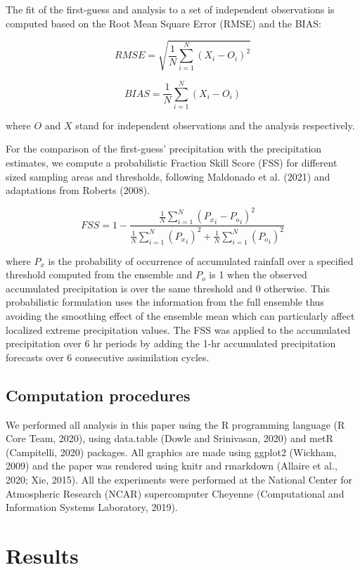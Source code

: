 \documentclass[final,5p,times,twocolumn,authoryear]{elsarticle} %
\begin{document}
The fit of the first-guess and analysis to a set of independent observations is computed based on the Root Mean Square Error (RMSE) and the BIAS:

\[\mathit{RMSE} = \sqrt{\frac{1}{N}\sum_{i = 1}^{N} (X_i - O_i)^{2}}\]

\[\mathit{BIAS} = \frac{1}{N}\sum_{i = 1}^{N} (X_i - O_i)\]

where \(O\) and \(X\) stand for independent observations and the analysis respectively.

For the comparison of the first-guess' precipitation with the precipitation estimates, we compute a probabilistic Fraction Skill Score (FSS) for different sized sampling areas and thresholds, following Maldonado et al. (2021) and adaptations from Roberts (2008).

\[\mathit{FSS} = 1-\frac{\frac{1}{N}\sum_{i=1}^{N} ({P_x}_i-{P_o}_i)^{2}}{\frac{1}{N}\sum_{i=1}^{N} ({P_x}_i)^{2}+\frac{1}{N}\sum_{i=1}^{N} ({P_o}_i)^{2}} \]

where \({P_x}\) is the probability of occurrence of accumulated rainfall over a specified threshold computed from the ensemble and \({P_o}\) is 1 when the observed accumulated precipitation is over the same threshold and 0 otherwise. This probabilistic formulation uses the information from the full ensemble thus avoiding the smoothing effect of the ensemble mean which can particularly affect localized extreme precipitation values. The FSS was applied to the accumulated precipitation over 6 hr periods by adding the 1-hr accumulated precipitation forecasts over 6 consecutive assimilation cycles.

\hypertarget{computation-procedures}{%
\subsection{Computation procedures}\label{computation-procedures}}

We performed all analysis in this paper using the R programming language (R Core Team, 2020), using data.table (Dowle and Srinivasan, 2020) and metR (Campitelli, 2020) packages.
All graphics are made using ggplot2 (Wickham, 2009) and the paper was rendered using knitr and rmarkdown (Allaire et al., 2020; Xie, 2015). All the experiments were performed at the National Center for Atmospheric Research (NCAR) supercomputer Cheyenne (Computational and Information Systems Laboratory, 2019).

\hypertarget{results}{%
\section{Results}\label{results}}
\end{document}
